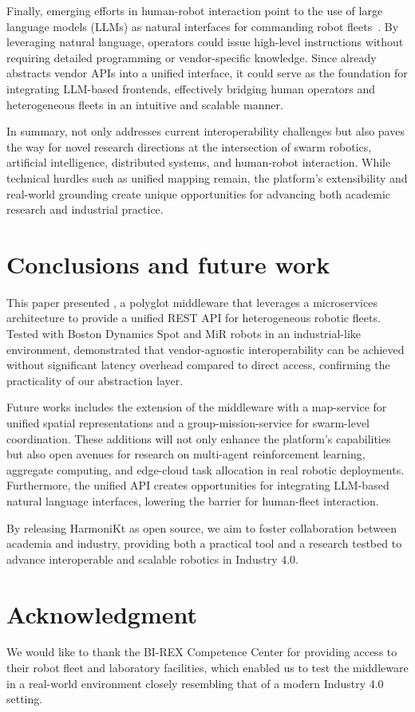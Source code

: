 \documentclass[conference]{IEEEtran}
\begin{document}
Finally, emerging efforts in human-robot interaction point to the use of large language models (LLMs) 
 as natural interfaces for commanding robot fleets~\cite{olaiya2025natural,aguzzi2025language}. 
% 
By leveraging natural language, operators could issue high-level instructions without requiring 
 detailed programming or vendor-specific knowledge. 
% 
Since \approach{} already abstracts vendor APIs into a unified interface, 
 it could serve as the foundation for integrating LLM-based frontends, 
 effectively bridging human operators and heterogeneous fleets in an intuitive and scalable manner.

In summary, \approach{} not only addresses current interoperability challenges 
 but also paves the way for novel research directions at the intersection of 
 swarm robotics, artificial intelligence, distributed systems, and human-robot interaction. 
% 
While technical hurdles such as unified mapping remain, 
 the platform's extensibility and real-world grounding create unique opportunities 
 for advancing both academic research and industrial practice.


\section{Conclusions and future work}\label{sec:future}

This paper presented \approach{}, 
 a polyglot middleware that leverages a microservices architecture to provide a unified REST API 
 for heterogeneous robotic fleets. 
% 
Tested with Boston Dynamics Spot and MiR robots in an industrial-like environment, 
 \approach{} demonstrated that vendor-agnostic interoperability can be achieved 
 without significant latency overhead compared to direct access, 
 confirming the practicality of our abstraction layer.

Future works includes the extension of the middleware with a map-service 
 for unified spatial representations and a group-mission-service for swarm-level coordination. 
% 
These additions will not only enhance the platform's capabilities 
 but also open avenues for research on multi-agent reinforcement learning, aggregate computing, 
 and edge-cloud task allocation in real robotic deployments. 
% 
Furthermore, the unified API creates opportunities for integrating LLM-based natural language interfaces, 
 lowering the barrier for human-fleet interaction.

By releasing HarmoniKt as open source, 
 we aim to foster collaboration between academia and industry, 
 providing both a practical tool and a research testbed 
 to advance interoperable and scalable robotics in Industry 4.0.


\section*{Acknowledgment}
We would like to thank the BI-REX Competence Center for providing access to their robot fleet and 
 laboratory facilities, which enabled us to test the middleware in a real-world environment closely 
  resembling that of a modern Industry 4.0 setting.




\end{document}
